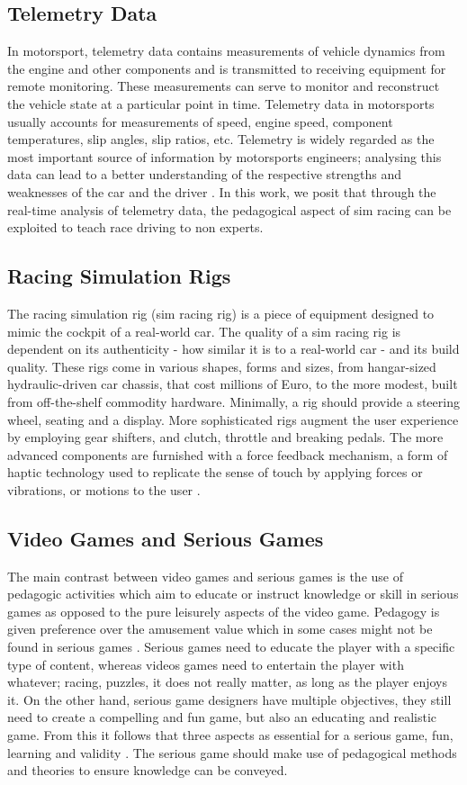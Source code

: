 \documentclass{sig-alternate}
\begin{document}
{\subsection{Telemetry Data}
In motorsport, telemetry data contains measurements of vehicle dynamics from the engine and other components and is transmitted to receiving equipment for remote monitoring. These measurements can serve to monitor and reconstruct the vehicle state at a particular point in time. Telemetry data in motorsports usually accounts for measurements of speed, engine speed, component temperatures, slip angles, slip ratios, etc. Telemetry is widely regarded as the most important source of information by motorsports engineers; analysing this data can lead to a better understanding of the respective strengths and weaknesses of the car and the driver \cite{CarDataAnalysis}. In this work, we posit that through the real-time analysis of telemetry data, the pedagogical aspect of sim racing can be exploited to teach race driving to non experts.

\subsection{Racing Simulation Rigs}
The racing simulation rig (sim racing rig) is a piece of equipment designed to mimic the cockpit of a real-world car. The quality of a sim racing rig is dependent on its authenticity - how similar it is to a real-world car - and its build quality. These rigs come in various shapes, forms and sizes, from hangar-sized hydraulic-driven car chassis, that cost millions of Euro, to the more modest, built from off-the-shelf commodity hardware. Minimally, a rig should provide a steering wheel, seating and a display. More sophisticated rigs augment the user experience by employing gear shifters, and clutch, throttle and breaking pedals. The more advanced components are furnished with a force feedback mechanism, a form of haptic technology used to replicate the sense of touch by applying forces or vibrations, or motions to the user \cite{li2015can}.

\subsection{Video Games and Serious Games}
The main contrast between video games and serious games is the use of pedagogic activities which aim to educate or instruct knowledge or skill \cite{zyda2005visual} in serious games as opposed to the pure leisurely aspects of the video game. Pedagogy is given preference over the amusement value which in some cases might not be found in serious games \cite{zyda2005visual}. Serious games need to educate the player with a specific type of content, whereas videos games need to entertain the player with whatever; racing, puzzles, it does not really matter, as long as the player enjoys it\cite{Harteveld2007}. On the other hand, serious game designers have multiple objectives, they still need to create a compelling and fun game, but also an educating and realistic game. From this it follows that three aspects as essential for a serious game, fun, learning and validity \cite{Harteveld2007}. The serious game should make use of pedagogical methods and theories to ensure knowledge can be conveyed.
}
\end{document}
